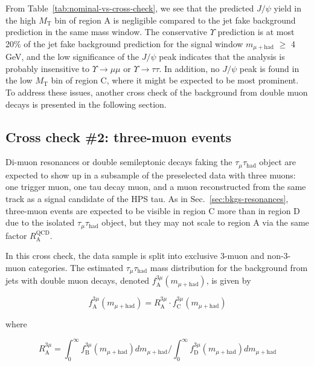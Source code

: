 From Table~\ref{tab:nominal-vs-cross-check}, we see that the predicted $J\slash\psi$ yield in the high $M_{\text{T}}$ bin of region A is negligible compared to the jet fake background prediction in the same mass window.  The conservative $\Upsilon$ prediction is at most 20\% of the jet fake background prediction for the signal window $m_{\mu+\text{had}}$ $\geq$ 4 GeV, and the low significance of the $J\slash\psi$ peak indicates that the analysis is probably insensitive to $\Upsilon\rightarrow\mu\mu$ or $\Upsilon\rightarrow\tau\tau$.  In addition, no $J\slash\psi$ peak is found in the low $M_{\text{T}}$ bin of region C, where it might be expected to be most prominent.  To address these issues, another cross check of the background from double muon decays is presented in the following section.

\subsection{Cross check \#2: three-muon events\label{sec:bkgs-3-muon}}

Di-muon resonances or double semileptonic decays faking the $\tau_{\mu}\tau_{\text{had}}$ object are expected to show up in a subsample of the preselected data with three muons: one trigger muon, one tau decay muon, and a muon reconstructed from the same track as a signal candidate of the HPS tau.  As in Sec.~\ref{sec:bkgs-resonances}, three-muon events are expected to be visible in region C more than in region D due to the isolated $\tau_{\mu}\tau_{\text{had}}$ object, but they may not scale to region A via the same factor $R_{\text{A}}^{\text{QCD}}$.

In this cross check, the data sample is split into exclusive 3-muon and non-3-muon categories.  The estimated $\tau_{\mu}\tau_{\text{had}}$ mass distribution for the background from jets with double muon decays, denoted $f_{\text{A}}^{3\mu}(m_{\mu+\text{had}})$, is given by

\begin{equation}
\label{eq:f-A-3mu}
f_{\text{A}}^{3\mu}(m_{\mu+\text{had}}) = R_{\text{A}}^{3\mu}\cdot f_{\text{C}}^{3\mu}(m_{\mu+\text{had}})
\end{equation}

where

\begin{equation}
\label{eq:R-A-3mu}
R_{\text{A}}^{3\mu} = \int_{0}^{\infty}f_{\text{B}}^{3\mu}(m_{\mu+\text{had}})dm_{\mu+\text{had}}/\int_{0}^{\infty}f_{\text{D}}^{3\mu}(m_{\mu+\text{had}})dm_{\mu+\text{had}}
\end{equation}

